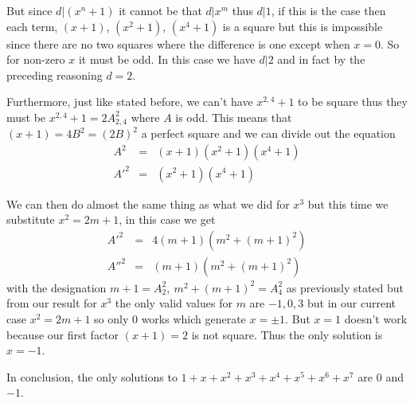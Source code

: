 \documentclass[aps,preprint,preprintnumbers,nofootinbib,showpacs,prd]{revtex4-1}
\newcommand{\nbea}{\begin{eqnarray*}}
\newcommand{\neea}{\end{eqnarray*}}
\begin{document}
But since $d|(x^n+1)$ it cannot be that $d|x^m$ thus $d|1$, if this is the case then each term, $(x+1)$, $(x^2+1)$, $(x^4+1)$ is a square but this is impossible since there are no two squares where the difference is one except when $x = 0$. So for non-zero $x$ it must be odd. In this case we have $d|2$ and in fact by the preceding reasoning $d = 2$.

Furthermore, just like stated before, we can't have $x^{2,4} + 1$ to be square thus they must be $x^{2,4} + 1 = 2A^2_{2,4}$ where $A$ is odd. This means that $(x+1) = 4B^2 = (2B)^2$ a perfect square and we can divide out the equation
%
\nbea
A^2 & = & (x + 1)(x^2 + 1)(x^4 + 1) \\
A'^2 & = & (x^2 + 1)(x^4 + 1)
\neea
%

We can then do almost the same thing as what we did for $x^3$ but this time we substitute $x^2 = 2m+1$, in this case we get
%
\nbea
A'^2 & = & 4(m + 1)(m^2 + (m + 1)^2) \\
A''^2 & = & (m + 1)(m^2 + (m + 1)^2)
\neea
%
with the designation $m + 1 = A^2_2, ~ m^2 + (m+1)^2 = A^2_4$ as previously stated but from our result for $x^3$ the only valid values for $m$ are $-1,0,3$ but in our current case $x^2 = 2m + 1$ so only 0 works which generate $x = \pm1$. But $x = 1$ doesn't work because our first factor $(x + 1) = 2$ is not square. Thus the only solution is $x= -1$.

In conclusion, the only solutions to $1 + x + x^2 + x^3 + x^4 + x^5 + x^6 + x^7$ are $0$ and $-1$.
\end{document}
